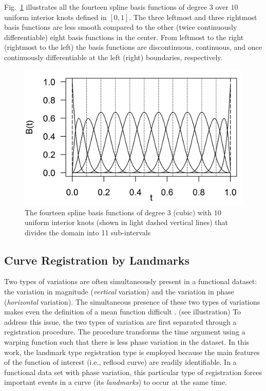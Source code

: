Fig.~\ref{fig:b_spline} illustrates all the fourteen spline basis functions of degree $3$ over $10$ uniform interior knots defined in $[0,1]$.
The three leftmost and three rightmost basis functions are less smooth compared to the other (twice continuously differentiable) eight basis functions in the center. 
From leftmost to the right (rightmost to the left) the basis functions are discontinuous, continuous, and once continuously differentiable at the left (right) boundaries, respectively.
\begin{figure}[bth]
	\centering
	\includegraphics[width=1.0\textwidth]{../figures/r-figures/bSpline.png}
	\caption[Spline basis functions of order $4$]{The fourteen spline basis functions of degree $3$ (cubic) with $10$ uniform interior knots (shown in light dashed vertical lines) that divides the domain into 11 sub-intervals}
	\label{fig:b_spline}
\end{figure}

\subsection{Curve Registration by Landmarks}\label{sub:sa_registration}

Two types of variations are often simultaneously present in a functional dataset: the variation in magnitude (\emph{vertical} variation) and the variation in phase (\emph{horizontal} variation).
The simultaneous presence of these two types of variations makes even the definition of a mean function difficult \cite{Kneip1992}. (see illustration)
To address this issue, the two types of variation are first separated through a registration procedure.
The procedure transforms the time argument using a warping function such that there is less phase variation in the dataset.
In this work, the landmark type registration type is employed because the main features of the function of interest (i.e., reflood curve) are readily identifiable.
In a functional data set with phase variation, this particular type of registration forces important events in a curve (its \emph{landmarks}) to occur at the same time.

